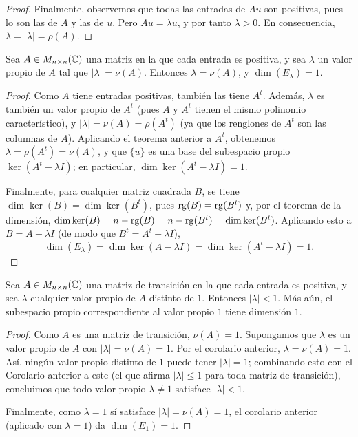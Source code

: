 \documentclass[12pt,a4paper]{book}
\begin{document}
\begin{proof}
        Finalmente, observemos que todas las entradas de $Au$ son positivas, pues lo son las de $A$ y las de $u$. Pero $Au=\lambda u$, y por tanto $\lambda>0$. En consecuencia, $\lambda=|\lambda|=\rho(A)$.
    \end{proof}

    \begin{corolario}
        Sea $A\in M_{n\times n}(\mathbb{C})$ una matriz en la que cada entrada es positiva, y sea $\lambda$ un valor propio de $A$ tal que $|\lambda|=\nu(A)$. Entonces $\lambda=\nu(A)$, y $\dim(E_\lambda)=1$.
    \end{corolario}

    \begin{proof}
        Como $A$ tiene entradas positivas, también las tiene $A^t$. Además, $\lambda$ es también un valor propio de $A^t$ (pues $A$ y $A^t$ tienen el mismo polinomio característico), y $|\lambda|=\nu(A)=\rho(A^t)$ (ya que los renglones de $A^t$ son las columnas de $A$). Aplicando el teorema anterior a $A^t$, obtenemos $\lambda=\rho(A^t)=\nu(A)$, y que $\{u\}$ es una base del subespacio propio $\ker(A^t-\lambda I)$; en particular, $\dim\ker(A^t-\lambda I)=1$.

        Finalmente, para cualquier matriz cuadrada $B$, se tiene $\dim\ker(B)=\dim\ker(B^t)$, pues $\operatorname{rg}(B)=\operatorname{rg}(B^t)$ y, por el teorema de la dimensión, $\dim\ker(B)=n-\operatorname{rg}(B)=n-\operatorname{rg}(B^t)=\dim\ker(B^t)$. Aplicando esto a $B=A-\lambda I$ (de modo que $B^t=A^t-\lambda I$),
        \begin{equation*}
            \dim(E_\lambda)=\dim\ker(A-\lambda I)=\dim\ker(A^t-\lambda I)=1.
        \end{equation*}
    \end{proof}

    \begin{corolario}
        Sea $A\in M_{n\times n}(\mathbb{C})$ una matriz de transición en la que cada entrada es positiva, y sea $\lambda$ cualquier valor propio de $A$ distinto de $1$. Entonces $|\lambda|<1$. Más aún, el subespacio propio correspondiente al valor propio $1$ tiene dimensión $1$.
    \end{corolario}

    \begin{proof}
        Como $A$ es una matriz de transición, $\nu(A)=1$. Supongamos que $\lambda$ es un valor propio de $A$ con $|\lambda|=\nu(A)=1$. Por el corolario anterior, $\lambda=\nu(A)=1$. Así, ningún valor propio distinto de $1$ puede tener $|\lambda|=1$; combinando esto con el Corolario anterior a este (el que afirma $|\lambda|\leq 1$ para toda matriz de transición), concluimos que todo valor propio $\lambda\neq 1$ satisface $|\lambda|<1$.

        Finalmente, como $\lambda=1$ sí satisface $|\lambda|=\nu(A)=1$, el corolario anterior (aplicado con $\lambda=1$) da $\dim(E_1)=1$.
    \end{proof}
\end{document}
